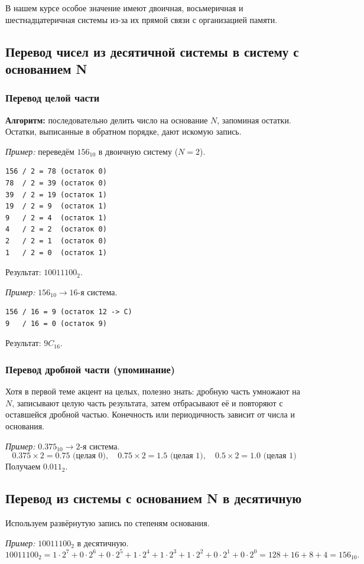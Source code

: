 В нашем курсе особое значение имеют двоичная, восьмеричная и шестнадцатеричная системы из-за их прямой связи с организацией памяти.

\subsection{Перевод чисел из десятичной системы в систему с основанием N}

\subsubsection*{Перевод целой части}
\textbf{Алгоритм:} последовательно делить число на основание $N$, запоминая остатки. Остатки, выписанные в обратном порядке, дают искомую запись.

\textit{Пример:} переведём $156_{10}$ в двоичную систему ($N=2$).
\begin{verbatim}
156 / 2 = 78 (остаток 0)
78  / 2 = 39 (остаток 0)
39  / 2 = 19 (остаток 1)
19  / 2 = 9  (остаток 1)
9   / 2 = 4  (остаток 1)
4   / 2 = 2  (остаток 0)
2   / 2 = 1  (остаток 0)
1   / 2 = 0  (остаток 1)
\end{verbatim}
Результат: $10011100_2$.

\textit{Пример:} $156_{10} \to 16$-я система.
\begin{verbatim}
156 / 16 = 9 (остаток 12 -> C)
9   / 16 = 0 (остаток 9)
\end{verbatim}
Результат: $9C_{16}$.

\subsubsection*{Перевод дробной части (упоминание)}
Хотя в первой теме акцент на целых, полезно знать: дробную часть умножают на $N$, записывают целую часть результата, затем отбрасывают её и повторяют с оставшейся дробной частью. Конечность или периодичность зависит от числа и основания.

\textit{Пример:} $0.375_{10} \to 2$-я система.
\[
0.375 \times 2 = 0.75 \text{ (целая 0)},\quad 0.75 \times 2 = 1.5 \text{ (целая 1)},\quad 0.5 \times 2 = 1.0 \text{ (целая 1)}
\]
Получаем $0.011_2$.

\subsection{Перевод из системы с основанием N в десятичную}
Используем развёрнутую запись по степеням основания.

\textit{Пример:} $10011100_2$ в десятичную.
\[
10011100_2 = 1\cdot2^7 + 0\cdot2^6 + 0\cdot2^5 + 1\cdot2^4 + 1\cdot2^3 + 1\cdot2^2 + 0\cdot2^1 + 0\cdot2^0
= 128 + 16 + 8 + 4 = 156_{10}.
\]

